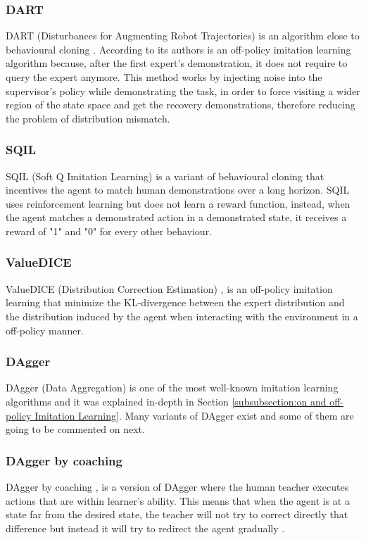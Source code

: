 \subsubsection*{DART}
DART (Disturbances for Augmenting Robot Trajectories) \cite{DART-Laskey:2017} is an algorithm close to behavioural cloning \cite{Behavioural-Cloning-Pomerleau:1991}. According to its authors is an off-policy imitation learning algorithm because, after the first expert's demonstration, it does not require to query the expert anymore. This method works by injecting noise into the supervisor's policy while demonstrating the task, in order to force visiting a wider region of the state space and get the recovery demonstrations, therefore reducing the problem of distribution mismatch.

\subsubsection*{SQIL}
SQIL (Soft Q Imitation Learning) \cite{SQIL-Reddy-Dragan-Levine:2019} is a variant of behavioural cloning that incentives the agent to match human demonstrations over a long horizon. SQIL uses reinforcement learning but does not learn a reward function, instead, when the agent matches a demonstrated action in a demonstrated state, it receives a reward of "1" and "0" for every other behaviour.

\subsubsection*{ValueDICE}
ValueDICE (Distribution Correction Estimation) \cite{ValueDICE-Kostrikov:2019}, is an off-policy imitation learning \cite{Laskey:phdthesis} that minimize the KL-divergence between the expert distribution and the distribution induced by the agent when interacting with the environment in a off-policy manner.


\subsubsection*{DAgger}
DAgger (Data Aggregation) \cite{DAgger-Ross:2011} is one of the most well-known imitation learning algorithms and it was explained in-depth in Section \ref{subsubsection:on and off-policy Imitation Learning}. Many variants of DAgger exist and some of them are going to be commented on next.



\subsubsection*{DAgger by coaching}
DAgger by coaching \cite{DAgger-by-coaching-He-DaumeIII-Eisner:2012},  is a version of DAgger \cite{DAgger-Ross:2011} where the human teacher executes actions that are within learner’s ability. This means that when the agent is at a state far from the desired state, the teacher will not try to correct directly that difference but instead it will try to redirect the agent gradually \cite{Global-overview-Attia:2018}.


